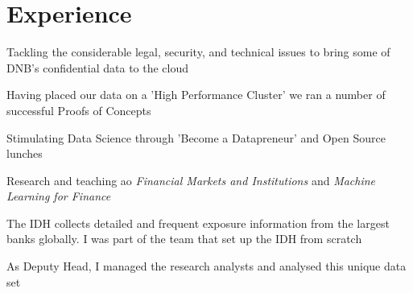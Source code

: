 \documentclass[]{deedy-resume-reversed}
\begin{document}
\begin{minipage}[t]{0.60\textwidth}



\section{Experience}
 \hspace{\fill}
\vspace{\topsep} %
\begin{tightemize}
\item Tackling the considerable legal, security, and technical issues to bring some of DNB's confidential data to the cloud
\item Having placed our data on a 'High Performance Cluster' we ran a number of successful Proofs of Concepts
\item Stimulating Data Science through 'Become a Datapreneur' and Open Source lunches
\end{tightemize}
\sectionsep


 \hspace{\fill}
\begin{tightemize}
\item Research and teaching ao \textit{Financial Markets and Institutions} and \textit{Machine Learning for Finance}
\end{tightemize}
\sectionsep


 \hspace{\fill}
\begin{tightemize}
\item The IDH collects detailed and frequent exposure information from the largest banks globally. I was part of the team that set up the IDH from scratch
\item As Deputy Head, I managed the research analysts and analysed this unique data set
\end{tightemize}
\sectionsep


\end{minipage}
\end{document}

